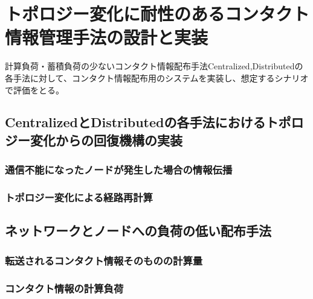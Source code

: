 \chapter{トポロジー変化に耐性のあるコンタクト情報管理手法の設計と実装}
\label{chap:design_and_impl}


計算負荷・蓄積負荷の少ないコンタクト情報配布手法Centralized,Distributedの各手法に対して、コンタクト情報配布用のシステムを実装し、想定するシナリオで評価をとる。

\section{CentralizedとDistributedの各手法におけるトポロジー変化からの回復機構の実装}
\subsection{通信不能になったノードが発生した場合の情報伝播}
\subsection{トポロジー変化による経路再計算}
\section{ネットワークとノードへの負荷の低い配布手法}
\subsection{転送されるコンタクト情報そのものの計算量}
\subsection{コンタクト情報の計算負荷}
